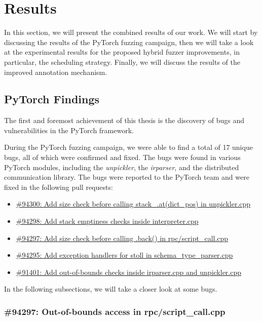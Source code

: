\section{Results}

In this section, we will present the combined results of our work. We will start by discussing the results of the PyTorch fuzzing campaign, then we will take a look at the experimental results for the proposed hybrid fuzzer improvements, in particular, the scheduling strategy. Finally, we will discuss the results of the improved annotation mechanism.

\subsection{PyTorch Findings} \label{results:pytorch-findings}

The first and foremost achievement of this thesis is the discovery of bugs and vulnerabilities in the PyTorch framework.

During the PyTorch fuzzing campaign, we were able to find a total of 17 unique bugs, all of which were confirmed and fixed. The bugs were found in various PyTorch modules, including the \textit{unpickler}, the \textit{irparser}, and the distributed communication library. The bugs were reported to the PyTorch team and were fixed in the following pull requests:

\begin{itemize}
    \item \href{https://github.com/pytorch/pytorch/pull/94300}{\#94300: Add size check before calling stack\_.at(dict\_pos) in unpickler.cpp}
    \item \href{https://github.com/pytorch/pytorch/pull/94298}{\#94298: Add stack emptiness checks inside interpreter.cpp}
    \item \href{https://github.com/pytorch/pytorch/pull/94297}{\#94297: Add size check before calling .back() in rpc/script\_call.cpp}
    \item \href{https://github.com/pytorch/pytorch/pull/94295}{\#94295: Add exception handlers for stoll in schema\_type\_parser.cpp}
    \item \href{https://github.com/pytorch/pytorch/pull/91401}{\#91401: Add out-of-bounds checks inside irparser.cpp and unpickler.cpp}
\end{itemize}

In the following subsections, we will take a closer look at some bugs.

\subsubsection{\#94297: Out-of-bounds access in rpc/script\_call.cpp}

